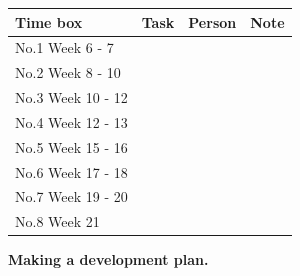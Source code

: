 \begin{table}
	\begin{tabular}{|l|c|c|c|}
		\hline
		Time box			&	Task			&			Person			&			Note \\\hline
		No.1 Week 6 - 7 	& 					&							&				 \\\hline
		No.2 Week 8 - 10	& 					&							&				 \\\hline
		No.3 Week 10 - 12	& 					&							&				 \\\hline
		No.4 Week 12 - 13	& 					&							&				 \\\hline
		No.5 Week 15 - 16	& 					&							&				 \\\hline
		No.6 Week 17 - 18	& 					&							&				 \\\hline
		No.7 Week 19 - 20	& 					&							&				 \\\hline
		No.8 Week 21	 	& 					&							&				 \\\hline
	\end{tabular}
\end{table}

\textbf{\Huge Making a development plan.}